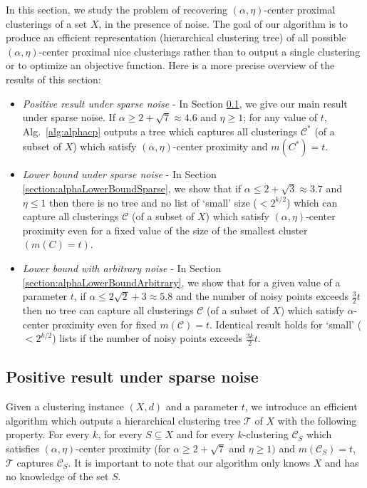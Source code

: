 \documentclass[12pt]{article}
\newcommand{\mc}{\mathcal}
\begin{document}
In this section, we study the problem of recovering $(\alpha, \eta)$-center proximal clusterings of a set $X$, in the presence of noise. The goal of our algorithm is to produce an efficient representation (hierarchical clustering tree) of all possible $(\alpha, \eta)$-center proximal nice clusterings rather than to output a single clustering or to optimize an objective function. Here is a more precise overview of the results of this section: 
\begin{itemize}[nolistsep,noitemsep,leftmargin=*]
\item  {\it Positive result under sparse noise} - In Section \ref{section:positiveResultSparseNoise}, we give our main result under sparse noise. If $\alpha \ge 2 + \sqrt{7} \approx 4.6$ and $\eta \ge 1$; for any value of $t$, Alg.~\ref{alg:alphacp} outputs a tree which captures all clusterings $\mc C^*$ (of a subset of $X$) which satisfy $(\alpha, \eta)$-center proximity and $m(C^*)=t$.
\item  {\it Lower bound under sparse noise} - In Section \ref{section:alphaLowerBoundSparse}, we show that if $\alpha \le 2 + \sqrt{3} \approx 3.7$ and $\eta \le 1$ then there is no tree and no list of `small' size ($< 2^{k/2}$) which can capture all clusterings $\mc C$ (of a subset of $X$) which satisfy $(\alpha, \eta)$-center proximity even for a fixed value of the size of the smallest cluster $(m(C) = t)$.
\item {\it Lower bound with arbitrary noise} - In Section \ref{section:alphaLowerBoundArbitrary}, we show that for a given value of a parameter $t$, if $\alpha \le 2\sqrt{2} + 3 \approx 5.8$ and the number of noisy points exceeds $\frac{3}{2}t$ then no tree can capture all clusterings $\mc C$ (of a subset of $X$) which satisfy $\alpha$-center proximity even for fixed $m(\mc C) = t$. Identical result holds for `small' ($<2^{k/2}$) lists if the number of noisy points exceeds $\frac{3k}{2}t$.
\end{itemize} 

\subsection{Positive result under sparse noise}
\label{section:positiveResultSparseNoise}
Given a clustering instance $(X, d)$ and a parameter $t$, we introduce an efficient algorithm which outputs a hierarchical clustering tree $\mc T$ of $X$ with the following property. For every $k$, for every $S \subseteq X$ and for every $k$-clustering $\mc C_{S}$ which satisfies $(\alpha, \eta)$-center proximity (for $\alpha \ge 2 + \sqrt{7}$ and $ \eta \ge 1)$ and $m(\mc C_{S}) = t$, $\mc T$ captures $\mc C_{S}$. It is important to note that our algorithm only knows $X$ and has no knowledge of the set $S$.
\end{document}
